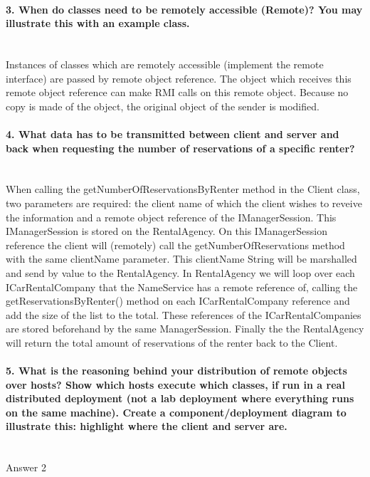 \documentclass{ds-report}
\begin{document}
	\paragraph{3. When do classes need to be remotely accessible (Remote)? You may illustrate this with an example
class.} \mbox{}\\
Instances of classes which are remotely accessible (implement the remote interface) are passed by remote object reference. The object which receives this remote object reference can make RMI calls on this remote object. Because no copy is made of the object, the original object of the sender is modified. 

	\paragraph{4. What data has to be transmitted between client and server and back when requesting the number
of reservations of a specific renter?} \mbox{}\\
	When calling the getNumberOfReservationsByRenter method in the Client class, two parameters are required: the client name of which the client wishes to reveive the information and a remote object reference of the IManagerSession. This IManagerSession is stored on the RentalAgency. On this IManagerSession reference the client will (remotely) call the getNumberOfReservations method with the same clientName parameter. This clientName String will be marshalled and send by value to the RentalAgency. 
In RentalAgency we will loop over each ICarRentalCompany that the NameService has a remote reference of, calling the getReservationsByRenter() method on each ICarRentalCompany reference and add the size of the list to the total. These references of the ICarRentalCompanies are stored beforehand by the same ManagerSession. 
Finally the the RentalAgency will return the total amount of reservations of the renter back to the Client.

	\paragraph{5. What is the reasoning behind your distribution of remote objects over hosts? Show which
hosts execute which classes, if run in a real distributed deployment (not a lab deployment where
everything runs on the same machine). Create a component/deployment diagram to illustrate this:
highlight where the client and server are.} \mbox{}\\
	Answer 2
\end{document}
